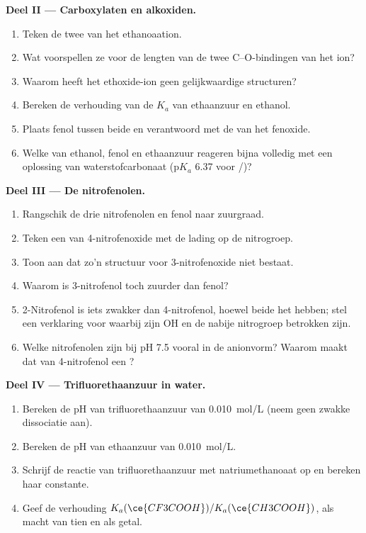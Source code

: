 \begin{problem}
\medskip
\noindent\textbf{Deel II --- Carboxylaten en alkoxiden.}
\begin{enumerate}[resume]
  \item Teken de twee  van het ethanoaation.
  \item Wat voorspellen ze voor de lengten van de twee C--O-bindingen van
        het ion?
  \item Waarom heeft het ethoxide-ion geen gelijkwaardige structuren?
  \item Bereken de verhouding van de $K_a$ van ethaanzuur en ethanol.
  \item Plaats fenol tussen beide en verantwoord met de
         van het fenoxide.
  \item Welke van ethanol, fenol en ethaanzuur reageren bijna volledig met
        een oplossing van waterstofcarbonaat ($\mathrm{p}K_a$ 6.37 voor
        /)?
\end{enumerate}

\medskip
\noindent\textbf{Deel III --- De nitrofenolen.}
\begin{enumerate}[resume]
  \item Rangschik de drie nitrofenolen en fenol naar zuurgraad.
  \item Teken een  van 4-nitrofenoxide met de lading op
        de nitrogroep.
  \item Toon aan dat zo'n structuur voor 3-nitrofenoxide niet bestaat.
  \item Waarom is 3-nitrofenol toch zuurder dan fenol?
  \item 2-Nitrofenol is iets zwakker dan 4-nitrofenol, hoewel beide het
         hebben; stel een verklaring voor waarbij zijn OH
        en de nabije nitrogroep betrokken zijn.
  \item Welke nitrofenolen zijn bij pH 7.5 vooral in de anionvorm? Waarom
        maakt dat van 4-nitrofenol een ?
\end{enumerate}

\medskip
\noindent\textbf{Deel IV --- Trifluorethaanzuur in water.}
\begin{enumerate}[resume]
  \item Bereken de pH van trifluorethaanzuur van \qty{0.010}{mol/L} (neem
        geen zwakke dissociatie aan).
  \item Bereken de pH van ethaanzuur van \qty{0.010}{mol/L}.
  \item Schrijf de reactie van trifluorethaanzuur met natriumethanoaat op
        en bereken haar constante.
  \item Geef de verhouding $K_a(\ce{CF3COOH})/K_a(\ce{CH3COOH})$, als macht
        van tien en als getal.
\end{enumerate}
\end{problem}
